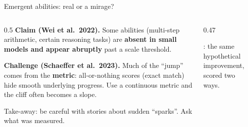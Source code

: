 \begin{frame}{Emergent abilities: real or a mirage?}
\begin{columns}[T]
\begin{column}{0.5\textwidth}
\small
\textbf{Claim (Wei et al.\ 2022).} Some abilities (multi-step arithmetic, certain reasoning tasks) are \textbf{absent in small models and appear abruptly} past a scale threshold.

\textbf{Challenge (Schaeffer et al.\ 2023).} Much of the ``jump'' comes from the \textbf{metric}: all-or-nothing scores (exact match) hide smooth underlying progress. Use a continuous metric and the cliff often becomes a slope.

\vspace{1mm}
Take-away: be careful with stories about sudden ``sparks''. Ask what was measured.
\end{column}
\begin{column}{0.47\textwidth}
\begin{sfig}[0.6]
\end{sfig}
{\scriptsize\illus: the same hypothetical improvement, scored two ways.}
\end{column}
\end{columns}
\end{frame}

